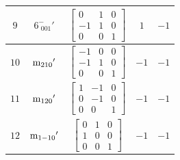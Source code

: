 \documentclass[fleqn,8pt]{jsarticle}
\begin{document}
\begin{longtable}{ccccc}
$ 9 $ & $ 6^{-}_{\,\,001}{}' $ & $ \begin{bmatrix} 0 & 1 & 0 \\ -1 & 1 & 0 \\ 0 & 0 & 1 \end{bmatrix} $ & $ 1 $ & $ -1 $ \\ \hline
$ 10 $ & $ {\rm m}_{210}{}' $ & $ \begin{bmatrix} -1 & 0 & 0 \\ -1 & 1 & 0 \\ 0 & 0 & 1 \end{bmatrix} $ & $ -1 $ & $ -1 $ \\ \hline
$ 11 $ & $ {\rm m}_{120}{}' $ & $ \begin{bmatrix} 1 & -1 & 0 \\ 0 & -1 & 0 \\ 0 & 0 & 1 \end{bmatrix} $ & $ -1 $ & $ -1 $ \\ \hline
$ 12 $ & $ {\rm m}_{1-10}{}' $ & $ \begin{bmatrix} 0 & 1 & 0 \\ 1 & 0 & 0 \\ 0 & 0 & 1 \end{bmatrix} $ & $ -1 $ & $ -1 $ \\
\end{longtable}
\end{document}
